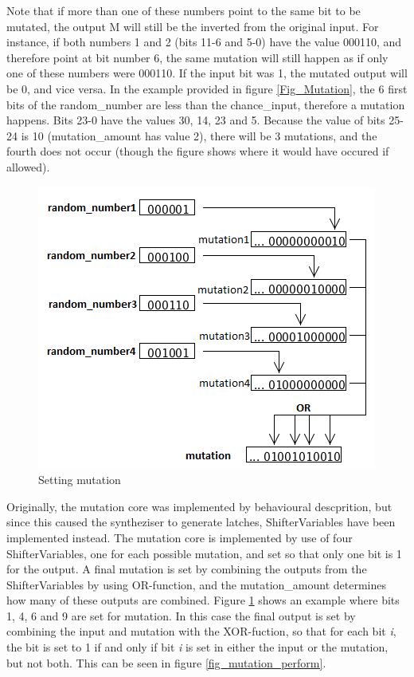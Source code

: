 Note that if more than one of these numbers point to the same bit to be mutated, the output M will still be the inverted from the original input. 
For instance, if both numbers 1 and 2 (bits 11-6 and 5-0) have the value 000110, and therefore point at bit number 6, the same mutation will still happen as if only one of these numbers were 000110. 
If the input bit was 1, the mutated output will be 0, and vice versa.
In the example provided in figure \ref{Fig_Mutation}, the 6 first bits of the random\_number are less than the chance\_input, therefore a mutation happens. Bits 23-0 have the values 30, 14, 23 and 5. 
Because the value of bits 25-24 is 10 (mutation\_amount has value 2), there will be 3 mutations, and the fourth does not occur (though the figure shows where it would have occured if allowed).

\begin{figure}[H]
\includegraphics[width=\textwidth]{fpga/fig/mutation_mask.png}
\caption{Setting mutation}
\label{fig_mutation_mask}
\end{figure}

Originally, the mutation core was implemented by behavioural descprition, but since this caused the syntheziser to generate latches, ShifterVariables have been implemented instead.
The mutation core is implemented by use of four ShifterVariables, one for each possible mutation, and set so that only one bit is 1 for the output. 
A final mutation is set by combining the outputs from the ShifterVariables by using OR-function, and the mutation\_amount determines how many of these outputs are combined. Figure \ref{fig_mutation_mask} shows an example where bits 1, 4, 6 and 9 are set for mutation. 
In this case the final output is set by combining the input and mutation with the XOR-fuction, so that for each bit \emph{i}, the bit is set to 1 if and only if bit \emph{i} is set in either the input or the mutation, but not both. This can be seen in figure \ref{fig_mutation_perform}.

